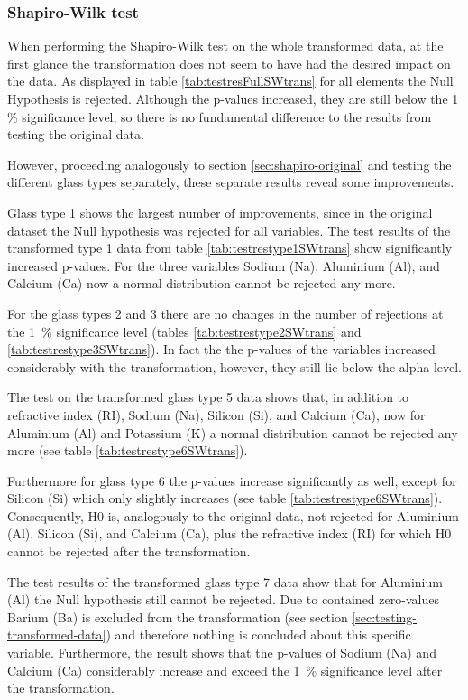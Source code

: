 \documentclass[a4paper, 12pt, titlepage, headsepline, listof = totoc, bibliography = totoc, numbers = noenddot]{scrartcl}
\begin{document}
\subsubsection{Shapiro-Wilk test}\label{sec:shapiro-transformed}

When performing the Shapiro-Wilk test on the whole transformed data, at the first glance the transformation does not seem to have had the desired impact on the data. As displayed in table \ref{tab:testresFullSWtrans} for all elements the Null Hypothesis is rejected. Although the p-values increased, they are still below the 1\, \% significance level, so there is no fundamental difference to the results from testing the original data.

However, proceeding analogously to section \ref{sec:shapiro-original} and testing the different glass types separately, these separate results reveal some improvements.

Glass type 1 shows the largest number of improvements, since in the original dataset the Null hypothesis was rejected for all variables. The test results of the transformed type 1 data from table \ref{tab:testrestype1SWtrans} show significantly increased p-values. For the three variables Sodium (Na), Aluminium (Al), and Calcium (Ca) now a normal distribution cannot be rejected any more.

For the glass types 2 and 3 there are no changes in the number of rejections at the 1\, \% significance level (tables \ref{tab:testrestype2SWtrans} and \ref{tab:testrestype3SWtrans}). In fact the the p-values of the variables increased considerably with the transformation, however, they still lie below the alpha level.

The test on the transformed glass type 5 data shows that, in addition to refractive index (RI), Sodium (Na), Silicon (Si), and Calcium (Ca), now for Aluminium (Al) and Potassium (K) a normal distribution cannot be rejected any more (see table \ref{tab:testrestype6SWtrans}).

Furthermore for glass type 6 the p-values increase significantly as well, except for Silicon (Si) which only slightly increases (see table \ref{tab:testrestype6SWtrans}). Consequently, H0 is, analogously to the original data, not rejected for Aluminium (Al), Silicon (Si), and Calcium (Ca), plus the refractive index (RI) for which H0 cannot be rejected after the transformation.

The test results of the transformed glass type 7 data show that for Aluminium (Al) the Null hypothesis still cannot be rejected. Due to contained zero-values Barium (Ba) is excluded from the transformation (see section \ref{sec:testing-transformed-data}) and therefore nothing is concluded about this specific variable. Furthermore, the result shows that the p-values of Sodium (Na) and Calcium (Ca) considerably increase and exceed the 1\, \% significance level after the transformation.
\end{document}
